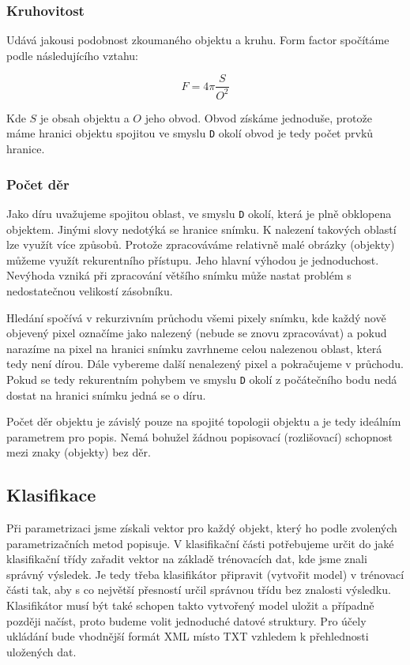 \documentclass[12pt]{article}
\begin{document}
\subsubsection{Kruhovitost}
Udává jakousi podobnost zkoumaného objektu a kruhu. Form factor spočítáme podle následujícího vztahu:

\begin{equation} \label{eq2}
F = 4\pi\frac{S}{O^2}
\end{equation}

Kde $S$ je obsah objektu a $O$ jeho obvod. Obvod získáme jednoduše, protože máme hranici objektu spojitou ve smyslu \texttt{D} okolí obvod je tedy počet prvků hranice.

\subsubsection{Počet děr}
Jako díru uvažujeme spojitou oblast, ve smyslu \texttt{D} okolí, která je plně obklopena objektem. Jinými slovy nedotýká se hranice snímku.
K nalezení takových oblastí lze využít více způsobů. Protože zpracováváme relativně malé obrázky (objekty) můžeme využít rekurentního přístupu. Jeho hlavní výhodou je jednoduchost. Nevýhoda vzniká při zpracování většího snímku může nastat problém s nedostatečnou velikostí zásobníku.

Hledání spočívá v rekurzivním průchodu všemi pixely snímku, kde každý nově objevený pixel označíme jako nalezený (nebude se znovu zpracovávat) a pokud narazíme na pixel na hranici snímku zavrhneme celou nalezenou oblast, která tedy není dírou. Dále vybereme další nenalezený pixel a pokračujeme v průchodu. Pokud se tedy rekurentním pohybem ve smyslu \texttt{D} okolí z počátečního bodu nedá dostat na hranici snímku jedná se o díru.

Počet děr objektu je závislý pouze na spojité topologii objektu a je tedy ideálním parametrem pro popis. Nemá bohužel žádnou popisovací (rozlišovací) schopnost mezi znaky (objekty) bez děr.

\subsection{Klasifikace}
Při parametrizaci jsme získali vektor pro každý objekt, který ho podle zvolených parametrizačních metod popisuje. V klasifikační části potřebujeme určit do jaké klasifikační třídy zařadit vektor na základě trénovacích dat, kde jsme znali správný výsledek. Je tedy třeba klasifikátor připravit (vytvořit model) v trénovací části tak, aby s co největší přesností určil správnou třídu bez znalosti výsledku. Klasifikátor musí být také schopen takto vytvořený model uložit a případně později načíst, proto budeme volit jednoduché datové struktury. Pro účely ukládání bude vhodnější formát XML místo TXT vzhledem k přehlednosti uložených dat.
\end{document}
